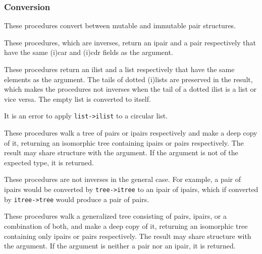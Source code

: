 \subsubsection{{Conversion}}

These procedures convert between mutable and immutable pair structures.

\begin{entry}{%
  }

These procedures, which are inverses, return an ipair and a pair
respectively that have the same (i)car and (i)cdr fields as the
argument.
\end{entry}

\begin{entry}{%
  }

  These procedures
  return an ilist and a list respectively that have the same elements
  as the argument. The tails of dotted (i)lists are preserved in the
  result, which makes the procedures not inverses when the tail of a
  dotted ilist is a list or vice versa. The empty list is converted to
  itself.

  It is an error to apply \texttt{list-\textgreater{}ilist} to a
  circular list.
\end{entry}

\begin{entry}{%
  }

  These
  procedures walk a tree of pairs or ipairs respectively and make a
  deep copy of it, returning an isomorphic tree containing ipairs or
  pairs respectively. The result may share structure with the
  argument. If the argument is not of the expected type, it is
  returned.

  These procedures are not inverses in the general case. For example,
  a pair of ipairs would be converted by
  \texttt{tree-\textgreater{}itree} to an ipair of ipairs, which if
  converted by \texttt{itree-\textgreater{}tree} would produce a pair
  of pairs.
\end{entry}

\begin{entry}{%
  }

  These procedures walk a generalized tree consisting of pairs,
  ipairs, or a combination of both, and make a deep copy of it,
  returning an isomorphic tree containing only ipairs or pairs
  respectively. The result may share structure with the argument. If
  the argument is neither a pair nor an ipair, it is returned.
\end{entry}

